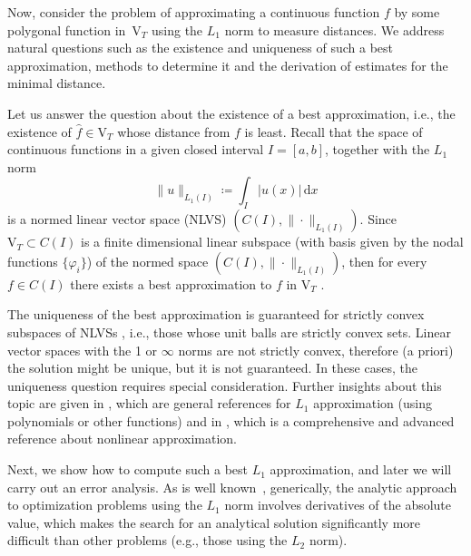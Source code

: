 \documentclass[a4paper,english]{IEEEtran}
\begin{document}
\label{sub:Best-LOne-polygonal-computation}

Now, consider the problem of approximating a continuous function $f$
by some polygonal function in~${\mathrm{V}_{T}}$ using the ${L_{1}}$ norm
to measure distances. We address natural questions such as the existence
and uniqueness of such a best approximation, methods to determine
it and the derivation of estimates for the minimal distance.

Let us answer the question about the existence of a best approximation,
i.e., the existence of ${\hat{f}}\in{\mathrm{V}_{T}}$ whose distance from $f$
is least. Recall that the space of continuous functions in a given
closed interval $I=[a,b]$, together with the ${L_{1}}$ norm
\begin{equation}
\|u\|_{{L_{1}}(I)}\coloneqq\int_{I}|u(x)|\,{\mathrm{d}} x\label{eq:DefLOneNorm}
\end{equation}
is a normed linear vector space (NLVS) $(C(I),\|\cdot\|_{{L_{1}}(I)})$.
Since ${\mathrm{V}_{T}}\subset C(I)$ is a finite dimensional linear subspace
(with basis given by the nodal functions $\{\varphi_{i}\}$) of the
normed space $(C(I),\|\cdot\|_{{L_{1}}(I)})$, then for every ${f}\in C(I)$
there exists a best approximation to ${f}$ in ${\mathrm{V}_{T}}$ \cite[Cor. 15.10]{Plato2003}
\cite[Thm. I.1]{Rivlin1969}. 

The uniqueness of the best approximation is guaranteed for strictly
convex subspaces of NLVSs \cite[Thm. 15.19]{Plato2003} \cite[Thm. I.3]{Rivlin1969},
i.e., those whose unit balls are strictly convex sets. Linear vector
spaces with the 1 or $\infty$ norms are not strictly convex, therefore
(a priori) the solution might be unique, but it is not guaranteed.
In these cases, the uniqueness question requires special consideration.
Further insights about this topic are given in \cite[ch. 4]{Rice1964BookVol1}\cite[ch. 3]{Rivlin1969},
which are general references for ${L_{1}}$ approximation (using polynomials
or other functions) and in \cite{DeVore1998}, which is a comprehensive
and advanced reference about nonlinear approximation. 

Next, we show how to compute such a best ${L_{1}}$ approximation, and
later we will carry out an error analysis. As is well known~\cite[p. 130]{MoonStirling2000},
generically, the analytic approach to optimization problems using
the ${L_{1}}$ norm involves derivatives of the absolute value, which
makes the search for an analytical solution significantly more difficult
than other problems (e.g., those using the ${L_{2}}$ norm). 
\end{document}
